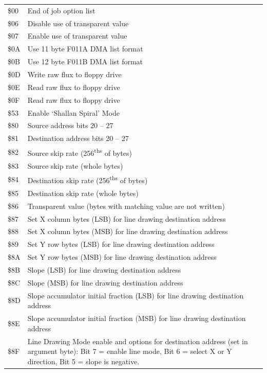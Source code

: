 \begin{center}
\begin{tabular}{|>{\centering\arraybackslash}p{1.5cm}|p{10cm}|}
  \hline
  \$00 & End of job option list \\
  \$06 & Disable use of transparent value \\
  \$07 & Enable use of transparent value \\
  \$0A & Use 11 byte F011A DMA list format \\
  \$0B & Use 12 byte F011B DMA list format \\
  \$0D & Write raw flux to floppy drive \\
  \$0E & Read raw flux to floppy drive \\
  \$0F & Read raw flux to floppy drive \\
  \$53 & Enable `Shallan Spiral' Mode \\
  \$80 & Source address bits 20 -- 27 \\
  \$81 & Destination address bits 20 -- 27 \\
  \$82 & Source skip rate (256\textsuperscript{ths} of bytes) \\
  \$83 & Source skip rate (whole bytes) \\
  \$84 & Destination skip rate (256\textsuperscript{ths} of bytes) \\
  \$85 & Destination skip rate (whole bytes) \\
  \$86 & Transparent value (bytes with matching value are not written) \\
  \$87 & Set X column bytes (LSB) for line drawing destination address \\
  \$88 & Set X column bytes (MSB) for line drawing destination address \\
  \$89 & Set Y row bytes (LSB) for line drawing destination address \\
  \$8A & Set Y row bytes (MSB) for line drawing destination address \\
  \$8B & Slope (LSB) for line drawing destination address \\
  \$8C & Slope (MSB) for line drawing destination address \\
  \$8D & Slope accumulator initial fraction (LSB) for line drawing destination address \\
  \$8E & Slope accumulator initial fraction (MSB) for line drawing destination address \\
  \$8F & Line Drawing Mode enable and options for destination address (set in argument byte): Bit 7 = enable line mode, Bit 6 = select X or Y direction, Bit 5 = slope is negative. \\

\end{tabular}
\end{center}
